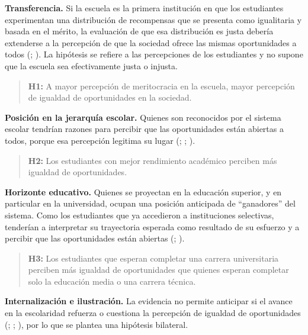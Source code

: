 \documentclass[
  spanish,
  a4paper,
  oneside]{scrbook}
\begin{document}
\textbf{Transferencia.} Si la escuela es la primera institución en que
los estudiantes experimentan una distribución de recompensas que se
presenta como igualitaria y basada en el mérito, la evaluación de que
esa distribución es justa debería extenderse a la percepción de que la
sociedad ofrece las mismas oportunidades a todos
(;
). La hipótesis se
refiere a las percepciones de los estudiantes y no supone que la escuela
sea efectivamente justa o injusta.

\begin{quote}
\textbf{H1:} A mayor percepción de meritocracia en la escuela, mayor
percepción de igualdad de oportunidades en la sociedad.
\end{quote}

\textbf{Posición en la jerarquía escolar.} Quienes son reconocidos por
el sistema escolar tendrían razones para percibir que las oportunidades
están abiertas a todos, porque esa percepción legitima su lugar
(;
;
).

\begin{quote}
\textbf{H2:} Los estudiantes con mejor rendimiento académico perciben
más igualdad de oportunidades.
\end{quote}

\textbf{Horizonte educativo.} Quienes se proyectan en la educación
superior, y en particular en la universidad, ocupan una posición
anticipada de ``ganadores'' del sistema. Como los estudiantes que ya
accedieron a instituciones selectivas, tenderían a interpretar su
trayectoria esperada como resultado de su esfuerzo y a percibir que las
oportunidades están abiertas
(;
).

\begin{quote}
\textbf{H3:} Los estudiantes que esperan completar una carrera
universitaria perciben más igualdad de oportunidades que quienes esperan
completar solo la educación media o una carrera técnica.
\end{quote}

\textbf{Internalización e ilustración.} La evidencia no permite
anticipar si el avance en la escolaridad refuerza o cuestiona la
percepción de igualdad de oportunidades
(;
;
), por lo que se
plantea una hipótesis bilateral.
\end{document}
